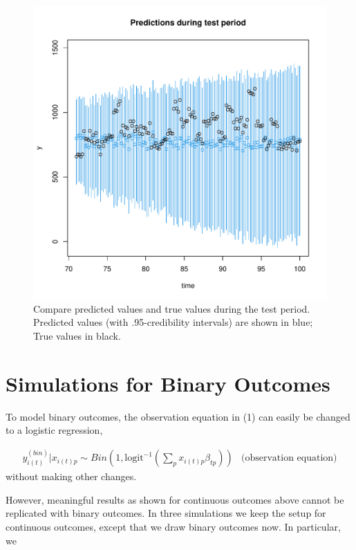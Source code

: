 \documentclass{article}
\begin{document}
\begin{figure}
	\centering
	\includegraphics[width=\textwidth]{compare_predictions_with_simulated_data.pdf}
	\caption{Compare predicted values and true values during the test period. Predicted values (with .95-credibility intervals) are shown in blue; True values in black.}
	\label{fig:fig4}
\end{figure}

\section{Simulations for Binary Outcomes}\label{sec:binary}

To model binary outcomes, the observation equation in (1) can easily be changed to a logistic regression,

\begin{eqnarray}
y^{(bin)}_{i(t)} | x_{i(t)p} \sim Bin(1, \textrm{logit}^{-1}(\sum_p x_{i(t)p} \beta_{tp})) & \textrm{(observation equation)}
\end{eqnarray}
without making other changes.

However, meaningful results as shown for continuous outcomes above cannot be replicated with binary outcomes. In three simulations we keep the setup for continuous outcomes, except that we draw binary outcomes now. In particular, we 
\end{document}
